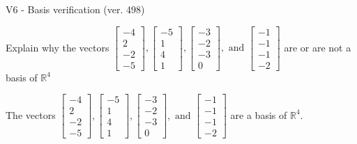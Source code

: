 \begin{exercise}
  \begin{exerciseTitle}V6 - Basis verification (ver. 498)\end{exerciseTitle}
  \begin{exerciseStatement}
    Explain why the vectors \(\left[\begin{array}{r}
-4 \\
2 \\
-2 \\
-5
\end{array}\right] , \left[\begin{array}{r}
-5 \\
1 \\
4 \\
1
\end{array}\right] , \left[\begin{array}{r}
-3 \\
-2 \\
-3 \\
0
\end{array}\right] , \text{ and } \left[\begin{array}{r}
-1 \\
-1 \\
-1 \\
-2
\end{array}\right]\) are or are not a basis of \(\mathbb{R}^4\)	


  \end{exerciseStatement}
  \begin{exerciseAnswer}
   The vectors \(\left[\begin{array}{r}
-4 \\
2 \\
-2 \\
-5
\end{array}\right] , \left[\begin{array}{r}
-5 \\
1 \\
4 \\
1
\end{array}\right] , \left[\begin{array}{r}
-3 \\
-2 \\
-3 \\
0
\end{array}\right] , \text{ and } \left[\begin{array}{r}
-1 \\
-1 \\
-1 \\
-2
\end{array}\right]\) 
  	 are  a basis of \(\mathbb{R}^4\).
  


  \end{exerciseAnswer}
\end{exercise}